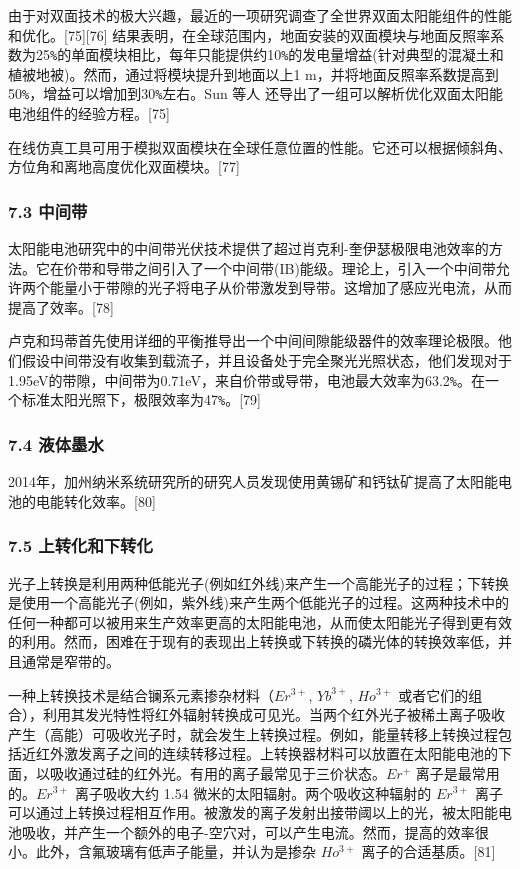 由于对双面技术的极大兴趣，最近的一项研究调查了全世界双面太阳能组件的性能和优化。[75][76] 结果表明，在全球范围内，地面安装的双面模块与地面反照率系数为25\verb|%|的单面模块相比，每年只能提供约10\verb|%|的发电量增益(针对典型的混凝土和植被地被)。然而，通过将模块提升到地面以上1 m，并将地面反照率系数提高到50\verb|%|，增益可以增加到30\verb|%|左右。Sun 等人 还导出了一组可以解析优化双面太阳能电池组件的经验方程。[75]

在线仿真工具可用于模拟双面模块在全球任意位置的性能。它还可以根据倾斜角、方位角和离地高度优化双面模块。[77]

\subsubsection{7.3 中间带}

太阳能电池研究中的中间带光伏技术提供了超过肖克利-奎伊瑟极限电池效率的方法。它在价带和导带之间引入了一个中间带(IB)能级。理论上，引入一个中间带允许两个能量小于带隙的光子将电子从价带激发到导带。这增加了感应光电流，从而提高了效率。[78]

卢克和玛蒂首先使用详细的平衡推导出一个中间间隙能级器件的效率理论极限。他们假设中间带没有收集到载流子，并且设备处于完全聚光光照状态，他们发现对于1.95eV的带隙，中间带为0.71eV，来自价带或导带，电池最大效率为63.2\verb|%|。在一个标准太阳光照下，极限效率为47\verb|%|。[79]

\subsubsection{7.4 液体墨水}

2014年，加州纳米系统研究所的研究人员发现使用黄锡矿和钙钛矿提高了太阳能电池的电能转化效率。[80]

\subsubsection{7.5 上转化和下转化}

光子上转换是利用两种低能光子(例如红外线)来产生一个高能光子的过程；下转换是使用一个高能光子(例如，紫外线)来产生两个低能光子的过程。这两种技术中的任何一种都可以被用来生产效率更高的太阳能电池，从而使太阳能光子得到更有效的利用。然而，困难在于现有的表现出上转换或下转换的磷光体的转换效率低，并且通常是窄带的。

一种上转换技术是结合镧系元素掺杂材料（$Er^{3+}$, $Yb^{3+}$, $Ho^{3+}$ 或者它们的组合），利用其发光特性将红外辐射转换成可见光。当两个红外光子被稀土离子吸收产生（高能）可吸收光子时，就会发生上转换过程。例如，能量转移上转换过程包括近红外激发离子之间的连续转移过程。上转换器材料可以放置在太阳能电池的下面，以吸收通过硅的红外光。有用的离子最常见于三价状态。$Er^{+}$ 离子是最常用的。$Er^{3+}$ 离子吸收大约 1.54 微米的太阳辐射。两个吸收这种辐射的 $Er^{3+}$ 离子可以通过上转换过程相互作用。被激发的离子发射出接带阈以上的光，被太阳能电池吸收，并产生一个额外的电子-空穴对，可以产生电流。然而，提高的效率很小。此外，含氟玻璃有低声子能量，并认为是掺杂 $Ho^{3+}$ 离子的合适基质。[81]

